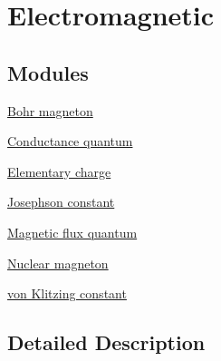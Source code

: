 \hypertarget{group___electromagnetic}{}\section{Electromagnetic}
\label{group___electromagnetic}
\subsection*{Modules}
\begin{DoxyCompactItemize}
\item 
\hyperlink{group___bohr_magneton}{Bohr magneton}
\item 
\hyperlink{group___conductance_quantum}{Conductance quantum}
\item 
\hyperlink{group___elementary_charge}{Elementary charge}
\item 
\hyperlink{group___josephson_constant}{Josephson constant}
\item 
\hyperlink{group___magnetic_flux_quantum}{Magnetic flux quantum}
\item 
\hyperlink{group___nuclear_magneton}{Nuclear magneton}
\item 
\hyperlink{group__von_klitzing_constant}{von Klitzing constant}
\end{DoxyCompactItemize}


\subsection{Detailed Description}
